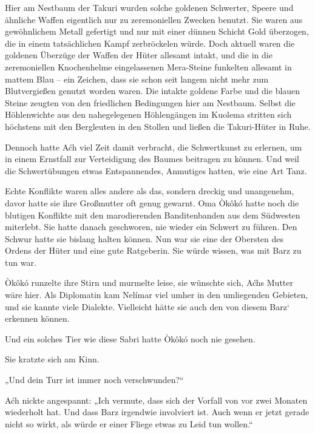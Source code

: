 Hier am Nestbaum der Takuri wurden solche goldenen Schwerter, Speere und ähnliche Waffen eigentlich nur zu zeremoniellen Zwecken benutzt. Sie waren aus gewöhnlichem Metall gefertigt und nur mit einer dünnen Schicht Gold überzogen, die in einem tatsächlichen Kampf zerbröckelen würde. Doch aktuell waren die goldenen Überzüge der Waffen der Hüter allesamt intakt, und die in die zeremoniellen Knochenhelme eingelassenen Mera-Steine funkelten allesamt in mattem Blau – ein Zeichen, dass sie schon seit langem nicht mehr zum Blutvergießen genutzt worden waren. Die intakte goldene Farbe und die blauen Steine zeugten von den friedlichen Bedingungen hier am Nestbaum. Selbst die Höhlenwichte aus den nahegelegenen Höhlengängen im Kuolema stritten sich höchstens mit den Bergleuten in den Stollen und ließen die Takuri-Hüter in Ruhe.

Dennoch hatte Aćh viel Zeit damit verbracht, die Schwertkunst zu erlernen, um in einem Ernstfall zur Verteidigung des Baumes beitragen zu können. Und weil die Schwertübungen etwas Entspannendes, Anmutiges hatten, wie eine Art Tanz.

Echte Konflikte waren alles andere als das, sondern dreckig und unangenehm, davor hatte sie ihre Großmutter oft genug gewarnt. Oma Òkôkó hatte noch die blutigen Konflikte mit den marodierenden Banditenbanden aus dem Südwesten miterlebt. Sie hatte danach geschworen, nie wieder ein Schwert zu führen. Den Schwur hatte sie bislang halten können. Nun war sie eine der Obersten des Ordens der Hüter und eine gute Ratgeberin. Sie würde wissen, was mit Barz zu tun war.



\trennzeichen



Òkôkó runzelte ihre Stirn und murmelte leise, sie wünschte sich, Aćhs Mutter wäre hier. Als Diplomatin kam Nelímar viel umher in den umliegenden Gebieten, und sie kannte viele Dialekte. Vielleicht hätte sie auch den von diesem Barz‘ erkennen können.

Und ein solches Tier wie diese Sabri hatte Òkôkó noch nie gesehen.

Sie kratzte sich am Kinn.

„Und dein Turr ist immer noch verschwunden?“

Aćh nickte angespannt: „Ich vermute, dass sich der Vorfall von vor zwei Monaten wiederholt hat. Und dass Barz irgendwie involviert ist. Auch wenn er jetzt gerade nicht so wirkt, als würde er einer Fliege etwas zu Leid tun wollen.“

